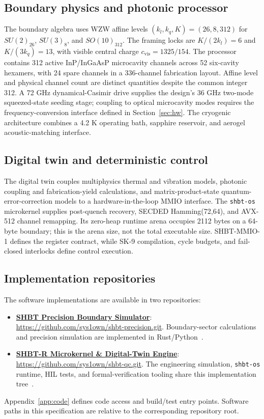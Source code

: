 \documentclass[11pt,a4paper]{article}
\newcommand{\shbtos}{\texttt{shbt-os}}
\begin{document}
\subsection{Boundary physics and photonic processor}
The boundary algebra uses WZW affine levels $(k_l,k_q,K)=(26,8,312)$ for
$SU(2)_{26}$, $SU(3)_8$, and $SO(10)_{312}$. The framing locks are
$K/(2k_l)=6$ and $K/(3k_q)=13$, with visible central charge $c_{\mathrm{vis}}=1325/154$.
The processor contains 312 active InP/InGaAsP microcavity channels across 52 six-cavity
hexamers, with 24 spare channels in a 336-channel fabrication layout. Affine level and
physical channel count are distinct quantities despite the common integer 312.
A 72 GHz dynamical-Casimir drive supplies the design's 36 GHz two-mode squeezed-state
seeding stage; coupling to optical microcavity modes requires the frequency-conversion
interface defined in Section~\ref{sec:hw}. The cryogenic architecture combines a 4.2 K
operating bath, sapphire reservoir, and aerogel acoustic-matching interface.

\subsection{Digital twin and deterministic control}
The digital twin couples multiphysics thermal and vibration models, photonic coupling
and fabrication-yield calculations, and matrix-product-state quantum-error-correction
models to a hardware-in-the-loop MMIO interface. The \shbtos{} microkernel supplies
post-quench recovery, SECDED Hamming(72,64), and AVX-512 channel remapping.
Its zero-heap runtime arena occupies 2112 bytes on a 64-byte boundary; this is the arena
size, not the total executable size. SHBT-MMIO-1 defines the register contract, while
SK-9 compilation, cycle budgets, and fail-closed interlocks define control execution.

\subsection{Implementation repositories}
The software implementations are available in two repositories:
\begin{itemize}[noitemsep]
\item \href{https://github.com/sys1own/shbt-precision.git}{\textbf{SHBT Precision Boundary Simulator}}:\newline
\url{https://github.com/sys1own/shbt-precision.git}. Boundary-sector calculations and
precision simulation are implemented in Rust/Python~\cite{precisioncode}.
\item \href{https://github.com/sys1own/shbt-qc.git}{\textbf{SHBT-R Microkernel \& Digital-Twin Engine}}:\newline
\url{https://github.com/sys1own/shbt-qc.git}. The engineering simulation, \shbtos{}
runtime, HIL tests, and formal-verification tooling share this implementation tree~\cite{qccode}.
\end{itemize}
Appendix~\ref{app:code} defines code access and build/test entry points. Software paths
in this specification are relative to the corresponding repository root.
\end{document}
